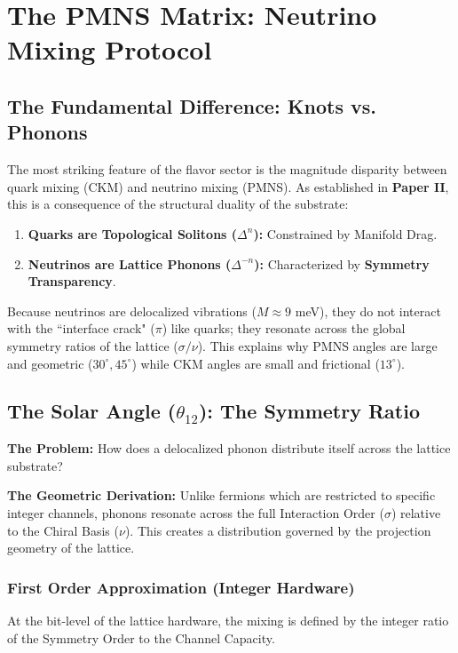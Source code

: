 \section{The PMNS Matrix: Neutrino Mixing Protocol}

\subsection{The Fundamental Difference: Knots vs. Phonons}

The most striking feature of the flavor sector is the magnitude disparity between quark mixing (CKM) and neutrino mixing (PMNS). As established in \textbf{Paper II}, this is a consequence of the structural duality of the substrate:

\begin{enumerate}
    \item \textbf{Quarks are Topological Solitons ($\Delta^n$):} Constrained by Manifold Drag.
    \item \textbf{Neutrinos are Lattice Phonons ($\Delta^{-n}$):} Characterized by \textbf{Symmetry Transparency}.
\end{enumerate}

Because neutrinos are delocalized vibrations ($M \approx 9$ meV), they do not interact with the ``interface crack" ($\pi$) like quarks; they resonate across the global symmetry ratios of the lattice ($\sigma/\nu$). This explains why PMNS angles are large and geometric ($30^\circ, 45^\circ$) while CKM angles are small and frictional ($13^\circ$).

\subsection{The Solar Angle (\texorpdfstring{$\theta_{12}$}{theta12}): The Symmetry Ratio}

\textbf{The Problem:} How does a delocalized phonon distribute itself across the lattice substrate?

\textbf{The Geometric Derivation:} Unlike fermions which are restricted to specific integer channels, phonons resonate across the full Interaction Order ($\sigma$) relative to the Chiral Basis ($\nu$). This creates a distribution governed by the projection geometry of the lattice.

\subsubsection{First Order Approximation (Integer Hardware)}
At the bit-level of the lattice hardware, the mixing is defined by the integer ratio of the Symmetry Order to the Channel Capacity.

